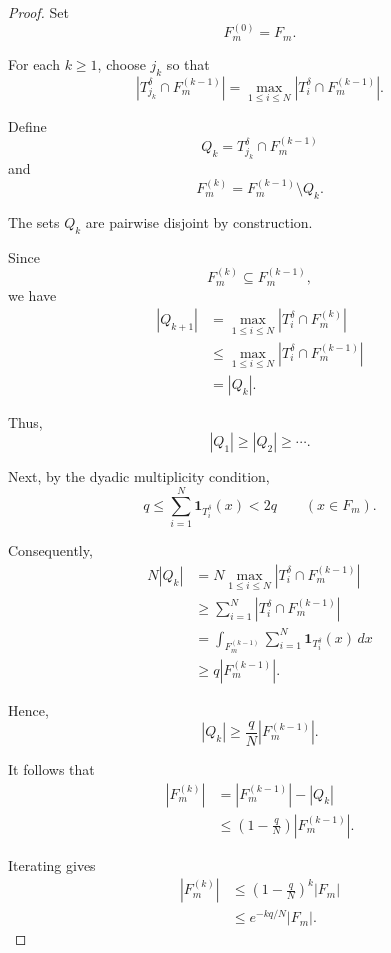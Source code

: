 \documentclass[11pt, letterpaper]{nyjm}
\begin{document}
	\begin{proof}
		
		Set
		\[
		F_m^{(0)}=F_m.
		\]
		
		For each $k\geq1$, choose $j_k$ so that
		\[
		|T_{j_k}^\delta\cap F_m^{(k-1)}|
		=
		\max_{1\leq i\leq N}
		|T_i^\delta\cap F_m^{(k-1)}|.
		\]
		
		Define
		\[
		Q_k=T_{j_k}^\delta\cap F_m^{(k-1)}
		\]
		and
		\[
		F_m^{(k)}
		=
		F_m^{(k-1)}\setminus Q_k.
		\]
		
		The sets $Q_k$ are pairwise disjoint
		by construction.
		
		Since
		\[
		F_m^{(k)}\subseteq F_m^{(k-1)},
		\]
		we have
		\[
		\begin{aligned}
			|Q_{k+1}|
			&=
			\max_{1\leq i\leq N}
			|T_i^\delta\cap F_m^{(k)}|\\
			&\leq
			\max_{1\leq i\leq N}
			|T_i^\delta\cap F_m^{(k-1)}|\\
			&=|Q_k|.
		\end{aligned}
		\]
		
		Thus,
		\[
		|Q_1|\geq|Q_2|\geq\cdots.
		\]
		
		Next, by the dyadic multiplicity condition,
		\[
		q\leq
		\sum_{i=1}^N\mathbf{1}_{T_i^\delta}(x)
		<2q
		\qquad (x\in F_m).
		\]
		
		Consequently,
		\[
		\begin{aligned}
			N|Q_k|
			&=
			N\max_{1\leq i\leq N}
			|T_i^\delta\cap F_m^{(k-1)}|\\
			&\geq
			\sum_{i=1}^N
			|T_i^\delta\cap F_m^{(k-1)}|\\
			&=
			\int_{F_m^{(k-1)}}
			\sum_{i=1}^N
			\mathbf{1}_{T_i^\delta}(x)\,dx\\
			&\geq q|F_m^{(k-1)}|.
		\end{aligned}
		\]
		
		Hence,
		\[
		\boxed{
			|Q_k|\geq
			\frac qN|F_m^{(k-1)}|.
		}
		\]
		
		It follows that
		\[
		\begin{aligned}
			|F_m^{(k)}|
			&=
			|F_m^{(k-1)}|-|Q_k|\\
			&\leq
			\left(1-\frac qN\right)
			|F_m^{(k-1)}|.
		\end{aligned}
		\]
		
		Iterating gives
		\[
		\begin{aligned}
			|F_m^{(k)}|
			&\leq
			\left(1-\frac qN\right)^k|F_m|\\
			&\leq e^{-kq/N}|F_m|.
		\end{aligned}
		\]
		

\end{proof}
\end{document}
